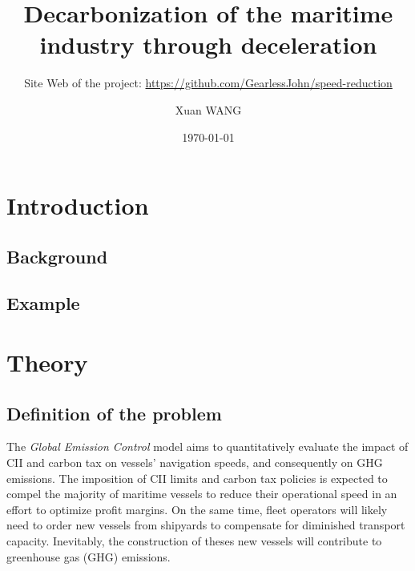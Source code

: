 \documentclass[a4paper,12pt]{article}
\author{Xuan WANG}
\date{\today}
\title{Decarbonization of the maritime industry through deceleration}
\subtitle{Site Web of the project: \url{https://github.com/GearlessJohn/speed-reduction}}%
\begin{document}
\maketitle

\tableofcontents




\renewcommand{\thepage}{\arabic{page}}


\newpage
\setcounter{page}{1}
\section{Introduction}

\subsection{Background}

\subsection{Example}



\section{Theory}

\subsection{Definition of the problem}

The \textit{Global Emission Control} model aims to quantitatively evaluate the impact of CII and carbon tax on vessels' navigation speeds, and consequently on GHG emissions.
The imposition of CII limits and carbon tax policies is expected to compel the majority of maritime vessels to reduce their operational speed in an effort to optimize profit margins.
On the same time, fleet operators will likely need to order new vessels from shipyards to compensate for diminished transport capacity.
Inevitably, the construction of theses new vessels will contribute to greenhouse gas (GHG) emissions.\\
\end{document}
